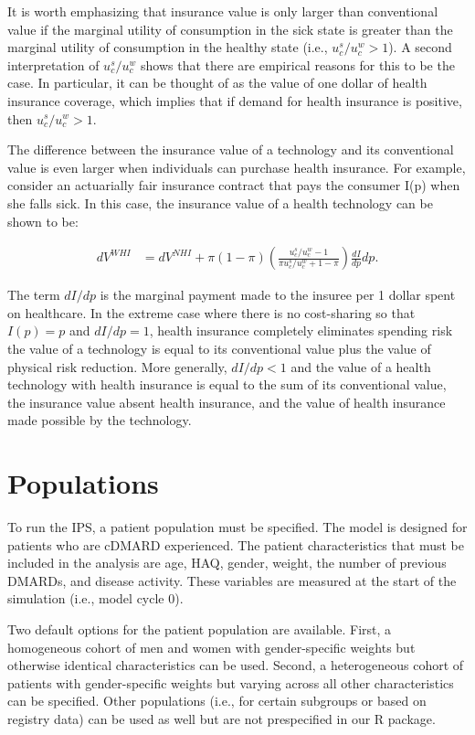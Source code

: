 \documentclass[11pt,final,fleqn]{article}\usepackage[]{graphicx}\usepackage[]{color}
\theoremstyle{plain}
\newcommand\R{{\textsf{R}}}
\begin{document}
It is worth emphasizing that insurance value is only larger than conventional value if the marginal utility of consumption in the sick state is greater than the marginal utility of consumption in the healthy state (i.e., $u_c^s/u_c^w > 1$). A second interpretation of $u_c^s/u_c^w$ shows that there are empirical reasons for this to be the case. In particular, it can be thought of as the value of one dollar of health insurance coverage, which implies that if demand for health insurance is positive, then $u_c^s/u_c^w > 1$.

The difference between the insurance value of a technology and its conventional value is even larger when individuals can purchase health insurance. For example, consider an actuarially fair insurance contract that pays the consumer I(p) when she falls sick. In this case, the insurance value of a health technology can be shown to be:

\begin{align}
dV^{WHI} &= dV^{NHI} + \pi (1 - \pi)\left(\frac{u_c^s/u_c^w - 1}{\pi u_c^s/u_c^w + 1 - \pi}\right)\frac{dI}{dp}dp.
\end{align}

The term $dI/dp$ is the marginal payment made to the insuree per 1 dollar spent on healthcare. In the extreme case where there is no cost-sharing so that $I(p) = p$ and $dI/dp = 1$, health insurance completely eliminates spending risk the value of a technology is equal to its conventional value plus the value of physical risk reduction. More generally, $dI/dp < 1$ and the value of a health technology with health insurance is equal to the sum of its conventional value, the insurance value absent health insurance, and the value of health insurance made possible by the technology. 

\section{Populations}\label{sec:populations}
To run the IPS, a patient population must be specified. The model is designed for patients who are cDMARD experienced. The patient characteristics that must be included in the analysis are age, HAQ, gender, weight, the number of previous DMARDs, and disease activity. These variables are measured at the start of the simulation (i.e., model cycle 0).  

Two default options for the patient population are available. First, a homogeneous cohort of men and women with gender-specific weights but otherwise identical characteristics can be used. Second, a heterogeneous cohort of patients with gender-specific weights but varying across all other characteristics can be specified. Other populations (i.e., for certain subgroups or based on registry data) can be used as well but are not prespecified in our \R{} package. 
\end{document}
